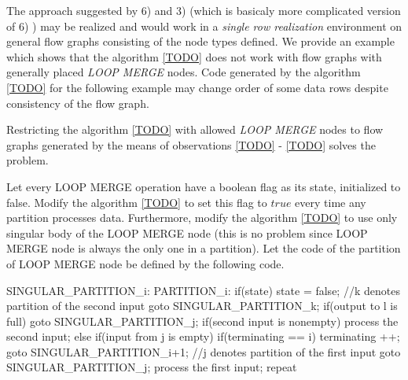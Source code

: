 The approach suggested by 6) and 3) (which is basicaly more complicated version of 6) ) may be realized and would work in a \emph{single row realization} environment on general flow graphs consisting of the node types defined. We provide an example which shows that the algorithm \ref{TODO} does not work with flow graphs with generally placed \emph{LOOP MERGE} nodes. Code generated by the algorithm \ref{TODO} for the following example may change order of some data rows despite consistency of the flow graph. 


Restricting the algorithm \ref{TODO} with allowed \emph{LOOP MERGE} nodes to flow graphs generated by the means of observations \ref{TODO} - \ref{TODO} solves the problem.

\begin{define}
  Let every LOOP MERGE operation have a boolean flag as its state, initialized to false. Modify the algorithm \ref{TODO} to set this flag to $true$ every time any partition processes data. Furthermore, modify the algorithm \ref{TODO} to use only singular body of the LOOP MERGE node (this is no problem since LOOP MERGE node is always the only one in a partition). Let the code of the partition of LOOP MERGE node be defined by the following code.
\end{define}
\begin{code}
SINGULAR_PARTITION_i:
PARTITION_i:
if(state)
{
  state = false;
  //k denotes partition of the second input
  goto SINGULAR_PARTITION_k; 
}
if(output to l is full)
  goto SINGULAR_PARTITION_j;
if(second input is nonempty)
{
  process the second input;
}
else
{
  if(input from j is empty)
  {
    if(terminating == i) 
    {
      terminating ++;
      goto SINGULAR_PARTITION_i+1;
    }
    //j denotes partition of the first input
    goto SINGULAR_PARTITION_j;
  }
  process the first input;
}
repeat
\end{code}

